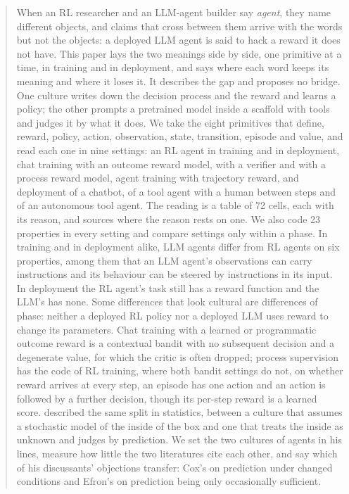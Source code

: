 \documentclass{article}
\begin{document}
\onecolumn
  \begin{icmlauthorlist}
  \end{icmlauthorlist}
  \vskip 0.3in

\printAffiliationsAndNotice{}

\begin{abstract}
When an RL researcher and an LLM-agent builder say \emph{agent}, they name different objects, and claims that cross between them arrive with the words but not the objects: a deployed LLM agent is said to hack a reward it does not have. This paper lays the two meanings side by side, one primitive at a time, in training and in deployment, and says where each word keeps its meaning and where it loses it. It describes the gap and proposes no bridge. One culture writes down the decision process and the reward and learns a policy; the other prompts a pretrained model inside a scaffold with tools and judges it by what it does. We take the eight primitives that \citet{sutton2018} define, reward, policy, action, observation, state, transition, episode and value, and read each one in nine settings: an RL agent in training and in deployment, chat training with an outcome reward model, with a verifier and with a process reward model, agent training with trajectory reward, and deployment of a chatbot, of a tool agent with a human between steps and of an autonomous tool agent. The reading is a table of 72 cells, each with its reason, and sources where the reason rests on one. We also code 23 properties in every setting and compare settings only within a phase. In training and in deployment alike, LLM agents differ from RL agents on six properties, among them that an LLM agent's observations can carry instructions and its behaviour can be steered by instructions in its input. In deployment the RL agent's task still has a reward function and the LLM's has none. Some differences that look cultural are differences of phase: neither a deployed RL policy nor a deployed LLM uses reward to change its parameters. Chat training with a learned or programmatic outcome reward is a contextual bandit with no subsequent decision and a degenerate value, for which the critic is often dropped; process supervision has the code of RL training, where both bandit settings do not, on whether reward arrives at every step, an episode has one action and an action is followed by a further decision, though its per-step reward is a learned score. \citet{breiman2001} described the same split in statistics, between a culture that assumes a stochastic model of the inside of the box and one that treats the inside as unknown and judges by prediction. We set the two cultures of agents in his lines, measure how little the two literatures cite each other, and say which of his discussants' objections transfer: Cox's on prediction under changed conditions and Efron's on prediction being only occasionally sufficient.
\end{abstract}
\end{document}
